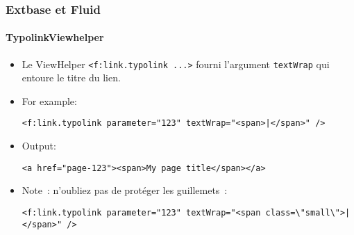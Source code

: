 %

\begin{frame}[fragile]
	\frametitle{Extbase et Fluid}
	\framesubtitle{TypolinkViewhelper}


	\begin{itemize}
		\item Le ViewHelper \texttt{<f:link.typolink ...>} fourni l'argument
			\texttt{textWrap} qui entoure le titre du lien.

		\item For example:
\begin{lstlisting}
<f:link.typolink parameter="123" textWrap="<span>|</span>" />
\end{lstlisting}

		\item Output:
\begin{lstlisting}
<a href="page-123"><span>My page title</span></a>
\end{lstlisting}

		\item Note~: n'oubliez pas de protéger les guillemets~:
\begin{lstlisting}
<f:link.typolink parameter="123" textWrap="<span class=\"small\">|</span>" />
\end{lstlisting}

	\end{itemize}

\end{frame}

